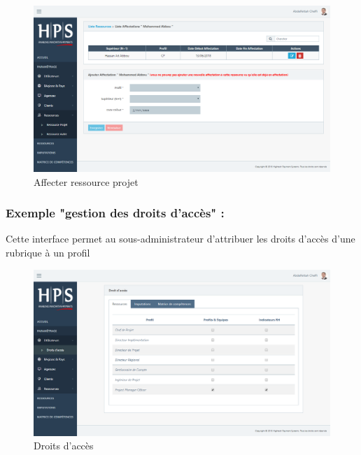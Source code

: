 \begin{itemize}[label=\textbullet]
\begin{itemize}
			\begin{figure}[h!]  
			\centering
			\includegraphics[width=1\textwidth]{chapitre5/Figures/affressource.png}
			\caption{Affecter ressource projet}
			\end{figure}
			\end{itemize}
\subsubsection*{Exemple "gestion des droits d'accès" : }
Cette interface permet au sous-administrateur d'attribuer les droits d'accès d'une rubrique à un profil
\begin{figure}[h!]  
			\centering
			\includegraphics[width=1\textwidth]{chapitre5/Figures/droit.png}
			\caption{Droits d'accès}
			\end{figure}



\end{itemize}
